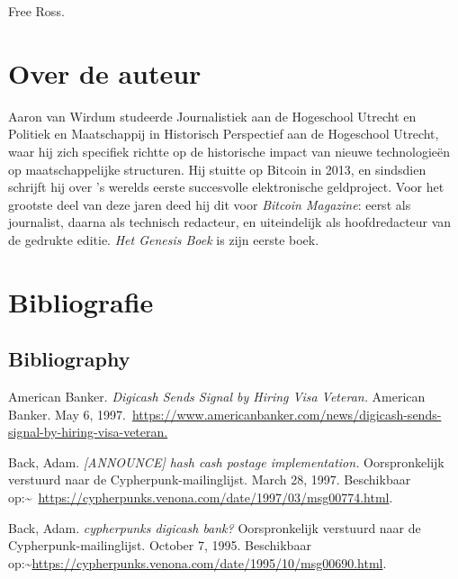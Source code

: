 \documentclass[smalldemyvopaper,11pt,twoside,onecolumn,openright,extrafontsizes,hidelinks]{memoir}
\begin{document}
Free Ross.


\chapter*{Over de auteur}\label{over-de-auteur}


Aaron van Wirdum studeerde Journalistiek aan de Hogeschool Utrecht en
Politiek en Maatschappij in Historisch Perspectief aan de Hogeschool
Utrecht, waar hij zich specifiek richtte op de historische impact van
nieuwe technologieën op maatschappelijke structuren. Hij stuitte op
Bitcoin in 2013, en sindsdien schrijft hij over 's werelds eerste
succesvolle elektronische geldproject. Voor het grootste deel van deze
jaren deed hij dit voor \emph{Bitcoin Magazine}: eerst als journalist,
daarna als technisch redacteur, en uiteindelijk als hoofdredacteur van
de gedrukte editie. \emph{Het Genesis Boek} is zijn eerste boek.


\chapter*{Bibliografie}\label{bibliografie}


\section*{Bibliography}\label{bibliography}


American Banker. \emph{Digicash Sends Signal by Hiring Visa Veteran.}
American Banker. May 6,
1997.~\url{https://www.americanbanker.com/news/digicash-sends-signal-by-hiring-visa-veteran.}

Back, Adam. \emph{{[}ANNOUNCE{]} hash cash postage implementation.}
Oorspronkelijk verstuurd naar de Cypherpunk-mailinglijst. March 28,
1997. Beschikbaar
op:\textasciitilde~\url{https://cypherpunks.venona.com/date/1997/03/msg00774.html}.

Back, Adam. \emph{cypherpunks digicash bank?} Oorspronkelijk verstuurd
naar de Cypherpunk-mailinglijst. October 7, 1995. Beschikbaar
op:\textasciitilde{}\url{https://cypherpunks.venona.com/date/1995/10/msg00690.html}.
\end{document}
